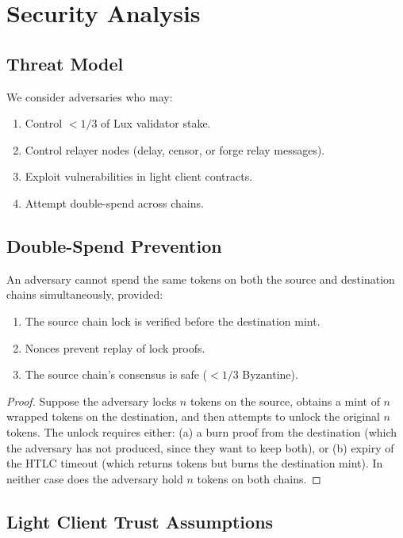 \section{Security Analysis}
\label{sec:security}

\subsection{Threat Model}

We consider adversaries who may:
\begin{enumerate}
    \item Control $< 1/3$ of Lux validator stake.
    \item Control relayer nodes (delay, censor, or forge relay messages).
    \item Exploit vulnerabilities in light client contracts.
    \item Attempt double-spend across chains.
\end{enumerate}

\subsection{Double-Spend Prevention}

\begin{theorem}
An adversary cannot spend the same tokens on both the source and destination chains simultaneously, provided:
\begin{enumerate}
    \item The source chain lock is verified before the destination mint.
    \item Nonces prevent replay of lock proofs.
    \item The source chain's consensus is safe ($< 1/3$ Byzantine).
\end{enumerate}
\end{theorem}

\begin{proof}
Suppose the adversary locks $n$ tokens on the source, obtains a mint of $n$ wrapped tokens on the destination, and then attempts to unlock the original $n$ tokens. The unlock requires either: (a) a burn proof from the destination (which the adversary has not produced, since they want to keep both), or (b) expiry of the HTLC timeout (which returns tokens but burns the destination mint). In neither case does the adversary hold $n$ tokens on both chains.
\end{proof}

\subsection{Light Client Trust Assumptions}

